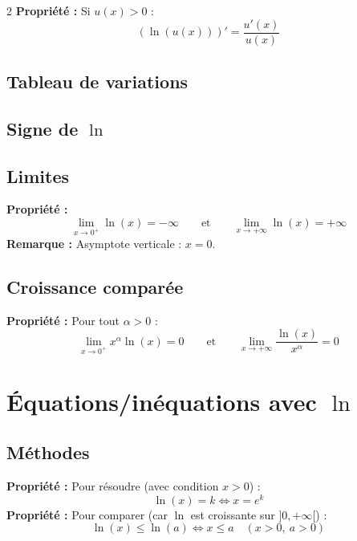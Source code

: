 \documentclass[11pt,a4paper]{article}
\newcommand{\prop}{\textbf{Propriété :} }
\newcommand{\rem}{\textbf{Remarque :} }
\begin{document}
\begin{paracol}{2}
\prop Si $u(x)>0$ :
\[
(\ln(u(x)))'=\frac{u'(x)}{u(x)}
\]

\subsection{Tableau de variations}
\begin{center}
\end{center}

\subsection{Signe de $\ln$}
\begin{center}
\end{center}

\subsection{Limites}
\prop
\[
\lim_{x\to 0^+}\ln(x)=-\infty
\qquad\text{et}\qquad
\lim_{x\to +\infty}\ln(x)=+\infty
\]
\rem Asymptote verticale : $x=0$.

\switchcolumn
\setcounter{subsection}{4} %

\subsection{Croissance comparée}

\prop Pour tout $\alpha>0$ :
\[
\lim_{x\to 0^+} x^{\alpha}\ln(x)=0
\qquad \text{et} \qquad
\lim_{x\to +\infty}\frac{\ln(x)}{x^{\alpha}}=0
\]

\setcounter{section}{2} %

\section{Équations/inéquations avec $\ln$}

\subsection{Méthodes}
\prop Pour résoudre (avec condition $x>0$) :
\[
\ln(x)=k \iff x=e^k
\]
\prop Pour comparer (car $\ln$ est croissante sur $]0,+\infty[$) :
\[
\ln(x)\le \ln(a) \iff x\le a \quad (x>0,\ a>0)
\]



\end{paracol}
\end{document}
